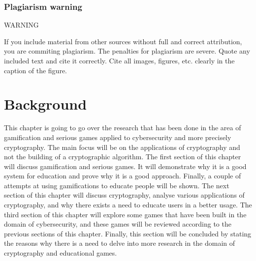 \documentclass{l4proj}
\begin{document}



\subsection{Plagiarism warning}

\begin{highlight_title}{WARNING}
    
    If you include material from other sources without full and correct attribution, you are commiting plagiarism. The penalties for plagiarism are severe.
    Quote any included text and cite it correctly. Cite all images, figures, etc. clearly in the caption of the figure.
\end{highlight_title}


\chapter{Background}

This chapter is going to go over the research that has been done in the area of gamification and serious games applied to cybersecurity and more precisely cryptography.
The main focus will be on the applications of cryptography and not the building of a cryptographic algorithm.
The first section of this chapter will discuss gamification and serious games. It will demonstrate why it is a good system for education and prove why it is a good approach.
Finally, a couple of attempts at using gamifications to educate people will be shown.
The next section of this chapter will discuss cryptography, analyse various applications of cryptography, and why there exists a need to educate users in a better usage.
The third section of this chapter will explore some games that have been built in the domain of cybersecurity, and these games will be reviewed according to the previous sections of this chapter.
Finally, this section will be concluded by stating the reasons why there is a need to delve into more research in the domain of cryptography and educational games.
\end{document}
